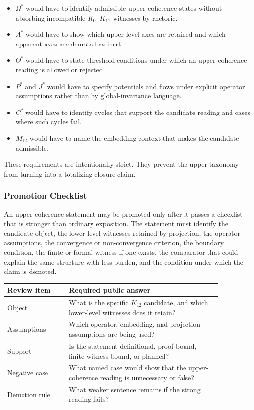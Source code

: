 \begin{itemize}
\item \(\Omega^*\) would have to identify admissible upper-coherence states
      without absorbing incompatible \(K_0\)--\(K_{11}\) witnesses by rhetoric.
\item \(A^*\) would have to show which upper-level axes are retained and which
      apparent axes are demoted as inert.
\item \(\Theta^*\) would have to state threshold conditions under which an
      upper-coherence reading is allowed or rejected.
\item \(P^*\) and \(J^*\) would have to specify potentials and flows under
      explicit operator assumptions rather than by global-invariance language.
\item \(C^*\) would have to identify cycles that support the candidate reading
      and cases where such cycles fail.
\item \(M_{12}\) would have to name the embedding context that makes the
      candidate admissible.
\end{itemize}

These requirements are intentionally strict. They prevent the upper taxonomy
from turning into a totalizing closure claim.

\subsubsection{Promotion Checklist}

An upper-coherence statement may be promoted only after it passes a checklist
that is stronger than ordinary exposition. The statement must identify the
candidate object, the lower-level witnesses retained by projection, the
operator assumptions, the convergence or non-convergence criterion, the
boundary condition, the finite or formal witness if one exists, the comparator
that could explain the same structure with less burden, and the condition under
which the claim is demoted.

\begin{center}
\begin{tabular}{p{0.25\linewidth}p{0.62\linewidth}}
\toprule
Review item & Required public answer \\
\midrule
Object & What is the specific \(K_{12}\) candidate, and which lower-level
witnesses does it retain? \\
Assumptions & Which operator, embedding, and projection assumptions are being
used? \\
Support & Is the statement definitional, proof-bound, finite-witness-bound, or
planned? \\
Negative case & What named case would show that the upper-coherence reading is
unnecessary or false? \\
Demotion rule & What weaker sentence remains if the strong reading fails? \\
\bottomrule
\end{tabular}
\end{center}

